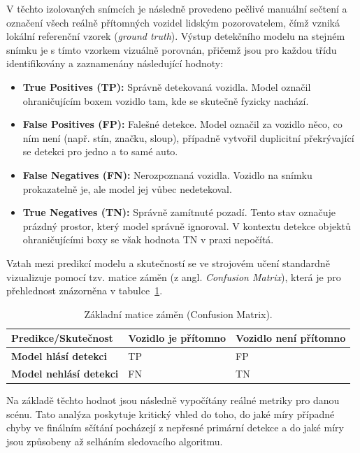 \documentclass[male,czech,api_bc]{kitheses}
\begin{document}
V těchto izolovaných snímcích je následně provedeno pečlivé manuální sečtení a označení všech reálně přítomných vozidel lidským pozorovatelem, čímž vzniká lokální referenční vzorek (\textit{ground truth}). Výstup detekčního modelu na stejném snímku je s tímto vzorkem vizuálně porovnán, přičemž jsou pro každou třídu identifikovány a zaznamenány následující hodnoty:
\begin{itemize}
    \item \textbf{True Positives (TP):} Správně detekovaná vozidla. Model označil ohraničujícím boxem vozidlo tam, kde se skutečně fyzicky nachází.
    \item \textbf{False Positives (FP):} Falešné detekce. Model označil za vozidlo něco, co ním není (např. stín, značku, sloup), případně vytvořil duplicitní překrývající se detekci pro jedno a to samé auto.
    \item \textbf{False Negatives (FN):} Nerozpoznaná vozidla. Vozidlo na snímku prokazatelně je, ale model jej vůbec nedetekoval.
    \item \textbf{True Negatives (TN):} Správně zamítnuté pozadí. Tento stav označuje prázdný prostor, který model správně ignoroval. V kontextu detekce objektů ohraničujícími boxy se však hodnota TN v praxi nepočítá. 
\end{itemize}

Vztah mezi predikcí modelu a skutečností se ve strojovém učení standardně vizualizuje pomocí tzv. matice záměn (z angl. \textit{Confusion Matrix}), která je pro přehlednost znázorněna v tabulce~\ref{tab:confusion_matrix_theory}.

\begin{table}[H]
    \centering
    \begin{tabular}{|l|l|l|}
        \hline
        \textbf{Predikce/Skutečnost} & \textbf{Vozidlo je přítomno} & \textbf{Vozidlo není přítomno} \\ \hline
        \textbf{Model hlásí detekci} & TP & FP \\ \hline
        \textbf{Model nehlásí detekci} & FN & TN \\ \hline
    \end{tabular}
    \caption{Základní matice záměn (Confusion Matrix).}
    \label{tab:confusion_matrix_theory}
\end{table}

Na základě těchto hodnot jsou následně vypočítány reálné metriky pro danou scénu. Tato analýza poskytuje kritický vhled do toho, do jaké míry případné chyby ve finálním sčítání pocházejí z nepřesné primární detekce a do jaké míry jsou způsobeny až selháním sledovacího algoritmu.
\end{document}
